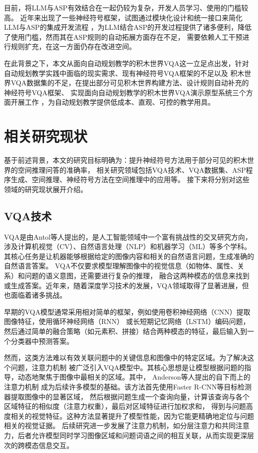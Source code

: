 目前，将LLM与ASP有效结合在一起仍较为复杂，开发人员学习、使用的门槛较高。
近年来出现了一些神经符号框架，试图通过模块化设计和统一接口来简化LLM与ASP的集成开发流程\cite{wang2024DSPy}
，为LLM结合ASP的开发过程提供了诸多便利，降低了使用门槛，然而其在ASP规则的自动拓展方面存在不足，
需要依赖人工干预进行规则扩充，在这一方面仍存在改进空间。

在此背景之下，本文从面向自动规划教学的积木世界VQA这一立足点出发，针对自动规划教学实践中面临的现实需求、现有神经符号VQA框架的不足以及
积木世界VQA数据集的不足，在提出部分可见积木世界构建方法、设计规则自动补充的神经符号VQA框架、
实现面向自动规划教学的积木世界VQA演示原型系统三个方面开展工作
，为自动规划教学提供低成本、直观、可控的教学用具。
\section{相关研究现状}
基于前述背景，本文的研究目标明确为：提升神经符号方法用于部分可见的积木世界的空间推理问答的准确率，
相关研究领域包括VQA技术、VQA数据集、ASP程序生成、空间推理、神经符号方法在空间推理中的应用等。
接下来将分别对这些领域的研究现状展开介绍。
\subsection{VQA技术}
VQA是由Antol等人\cite{Antol2015VQA}提出的，是人工智能领域中一个富有挑战性的交叉研究方向，
涉及计算机视觉（CV）、自然语言处理（NLP）和机器学习（ML）等多个学科。
其核心任务是让机器能够根据给定的图像内容和相关的自然语言问题，生成准确的自然语言答案。
VQA不仅要求模型理解图像中的视觉信息（如物体、属性、关系）和问题的语义意图，还需要进行复杂的推理，
融合这两种模态的信息来找到或生成答案。近年来，随着深度学习技术的发展，VQA领域取得了显著进展，但也面临着诸多挑战。

早期的VQA模型通常采用相对简单的框架，例如使用卷积神经网络（CNN）提取图像特征，使用循环神经网络（RNN）
或长短期记忆网络（LSTM）编码问题，然后通过简单的融合策略（如元素积、拼接）结合两种模态的特征，最后输入到一个分类器中预测答案。

然而，这类方法难以有效关联问题中的关键信息和图像中的特定区域。为了解决这个问题，注意力机制
被广泛引入VQA模型中。其核心思想是让模型根据问题的指导，动态地聚焦于图像中最相关的区域。其中， Anderson等人提出的自下而上的注意力机制\cite{anderson2018bottom}
成为后续许多模型的基础。该方法首先使用Faster R-CNN等目标检测器提取图像中的显著区域，
然后根据问题生成一个查询向量，计算该查询与各个区域特征的相似度（注意力权重），最后对区域特征进行加权求和，
得到与问题高度相关的视觉特征。这种方法显著提升了模型性能，因为它能更精确地定位与问题相关的视觉证据。
后续研究进一步发展了注意力机制，如分层注意力\cite{lu2016hierarchical}和共同注意力，后者允许模型同时学习图像区域和问题词语之间的相互关联，从而实现更深层次的跨模态信息交互。

